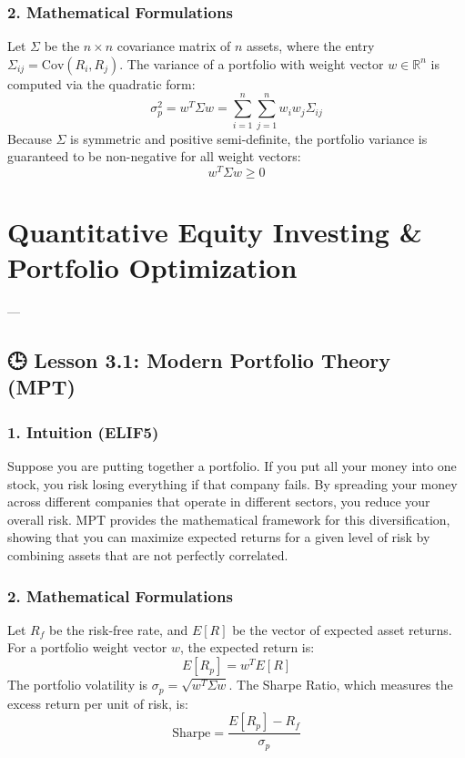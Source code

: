 \documentclass[11pt,oneside]{book}
\begin{document}
\subsection{2. Mathematical Formulations}
Let $\Sigma$ be the $n \times n$ covariance matrix of $n$ assets, where the entry $\Sigma_{ij} = \text{Cov}(R_i, R_j)$. The variance of a portfolio with weight vector $w \in \mathbb{R}^n$ is computed via the quadratic form:
$$\sigma_p^2 = w^T \Sigma w = \sum_{i=1}^n \sum_{j=1}^n w_i w_j \Sigma_{ij}$$
Because $\Sigma$ is symmetric and positive semi-definite, the portfolio variance is guaranteed to be non-negative for all weight vectors:
$$w^T \Sigma w \ge 0$$


\newpage

\chapter{Quantitative Equity Investing & Portfolio Optimization}

---

\section{🕒 Lesson 3.1: Modern Portfolio Theory (MPT)}

\subsection{1. Intuition (ELIF5)}
Suppose you are putting together a portfolio. If you put all your money into one stock, you risk losing everything if that company fails. By spreading your money across different companies that operate in different sectors, you reduce your overall risk. MPT provides the mathematical framework for this diversification, showing that you can maximize expected returns for a given level of risk by combining assets that are not perfectly correlated.

\subsection{2. Mathematical Formulations}
Let $R_f$ be the risk-free rate, and $E[R]$ be the vector of expected asset returns. For a portfolio weight vector $w$, the expected return is:
$$E[R_p] = w^T E[R]$$
The portfolio volatility is $\sigma_p = \sqrt{w^T \Sigma w}$. The Sharpe Ratio, which measures the excess return per unit of risk, is:
$$\text{Sharpe} = \frac{E[R_p] - R_f}{\sigma_p}$$
\end{document}
